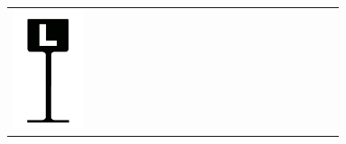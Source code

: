 {\begin{center}
\begin{tabular}{ >{\centering\arraybackslash}p{0.18\linewidth}  >{\centering\arraybackslash}p{0.18\linewidth}  >{\centering\arraybackslash}p{0.18\linewidth}  >{\centering\arraybackslash}p{0.19\linewidth}}
\includegraphics[scale=0.021, trim= 0em -5em -5em -5em,]{Icones/icon_loire_black.pdf}
&

\end{tabular}
\end{center}}
